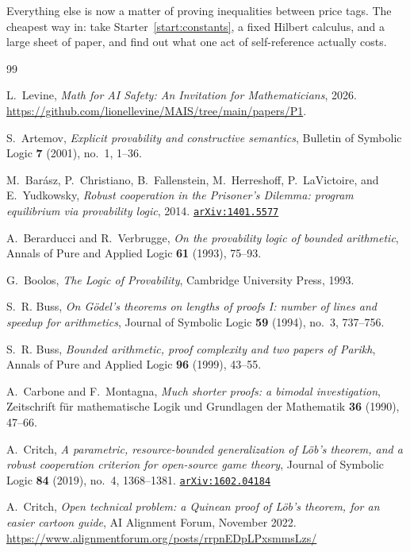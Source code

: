 \documentclass[11pt]{amsart}
\newcommand{\arxiv}[1]{\href{https://arxiv.org/abs/#1}{\texttt{arXiv:#1}}}
\theoremstyle{plain}
\theoremstyle{definition}
\begin{document}
Everything else is now a matter of proving inequalities between price tags. The cheapest way in: take Starter~\ref{start:constants}, a fixed Hilbert calculus, and a large sheet of paper, and find out what one act of self-reference actually costs.

\begin{thebibliography}{99}

L.~Levine,
\emph{Math for AI Safety: An Invitation for Mathematicians},
2026. \url{https://github.com/lionellevine/MAIS/tree/main/papers/P1}.


S.~Artemov,
\emph{Explicit provability and constructive semantics},
Bulletin of Symbolic Logic \textbf{7} (2001), no.~1, 1--36.

M.~Bar\'asz, P.~Christiano, B.~Fallenstein, M.~Herreshoff, P.~LaVictoire, and E.~Yudkowsky,
\emph{Robust cooperation in the Prisoner's Dilemma: program equilibrium via provability logic},
2014. \arxiv{1401.5577}

A.~Berarducci and R.~Verbrugge,
\emph{On the provability logic of bounded arithmetic},
Annals of Pure and Applied Logic \textbf{61} (1993), 75--93.

G.~Boolos,
\emph{The Logic of Provability},
Cambridge University Press, 1993.

S.~R. Buss,
\emph{On G\"odel's theorems on lengths of proofs I: number of lines and speedup for arithmetics},
Journal of Symbolic Logic \textbf{59} (1994), no.~3, 737--756.

S.~R. Buss,
\emph{Bounded arithmetic, proof complexity and two papers of Parikh},
Annals of Pure and Applied Logic \textbf{96} (1999), 43--55.

A.~Carbone and F.~Montagna,
\emph{Much shorter proofs: a bimodal investigation},
Zeitschrift f\"ur mathematische Logik und Grundlagen der Mathematik \textbf{36} (1990), 47--66.

A.~Critch,
\emph{A parametric, resource-bounded generalization of L\"ob's theorem, and a robust cooperation criterion for open-source game theory},
Journal of Symbolic Logic \textbf{84} (2019), no.~4, 1368--1381. \arxiv{1602.04184}

A.~Critch,
\emph{Open technical problem: a Quinean proof of L\"ob's theorem, for an easier cartoon guide},
AI Alignment Forum, November 2022.
\url{https://www.alignmentforum.org/posts/rrpnEDpLPxsmmsLzs/}


\end{thebibliography}
\end{document}
